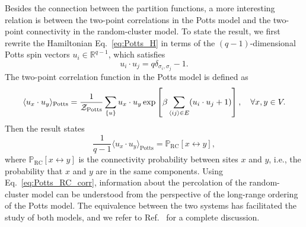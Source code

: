 Besides the connection between the partition functions, a more interesting relation is between the two-point correlations in the Potts model
and the two-point connectivity in the random-cluster model\cite{Grimmett2006}. To state the result, we first rewrite the Hamiltonian Eq.~\eqref{eq:Potts_H} in
terms of the $(q-1)$-dimensional Potts spin vectors $u_i \in \mathbb{R}^{q-1}$, which satisfies 
\begin{equation}
	u_i \cdot u_j = q\delta_{\sigma_i, \sigma_j} - 1.
\end{equation}
The two-point correlation function in the Potts model is defined as 
\begin{equation}
	\langle u_x \cdot u_y \rangle_{\text{Potts}} = \frac{1}{{\mathcal Z}_{\text{Potts}}} \sum_{\{u\}}u_x \cdot u_y 
	\exp\left[\beta \sum_{\langle ij \rangle \in E} (u_i\cdot u_j  + 1) \right], \quad \forall x, y\in V.
\end{equation}
Then the result states 
\begin{equation}\label{eq:Potts_RC_corr}
	\frac{1}{q-1}\langle u_x \cdot u_y \rangle_{\text{Potts}} = \mathbb{P}_{\text{RC}}[x \leftrightarrow y],
\end{equation}
where $\mathbb{P}_{\text{RC}}[x\leftrightarrow y]$ is the connectivity probability between sites $x$ and $y$, i.e., the
probability that $x$ and $y$ are in the same components. Using Eq.~\eqref{eq:Potts_RC_corr}, information about the percolation
of the random-cluster model can be understood from the perspective of the long-range ordering of the Potts model.
The equivalence between the two systems has facilitated the study of both models, and we refer to Ref.~ for a complete discussion.

